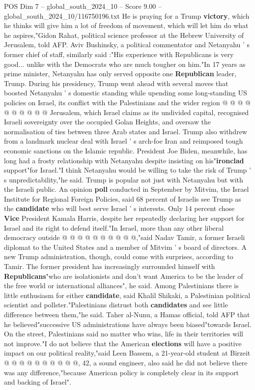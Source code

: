 \begin{textsample}{POS Dim 7 – global\_south\_2024\_10 – Score 9.00 – global\_south\_2024\_10/116750196.txt}
He is praying for a Trump \textbf{victory}, which he thinks will give him a lot of freedom of movement, which will let him do what he aspires,"Gidon Rahat, political science professor at the Hebrew University of Jerusalem, told AFP.
Aviv Bushinsky, a political commentator and Netanyahu ' s former chief of staff, similarly said :"His experience with Republicans is very good... unlike with the Democrats who are much tougher on him."In 17 years as prime minister, Netanyahu has only served opposite one \textbf{Republican} leader, Trump.
During his presidency, Trump went ahead with several moves that boosted Netanyahu ' s domestic standing while upending some long-standing US policies on Israel, its conflict with the Palestinians and the wider region @ @ @ @ @ @ @ @ @ @ Jerusalem, which Israel claims as its undivided capital, recognised Israeli sovereignty over the occupied Golan Heights, and oversaw the normalisation of ties between three Arab states and Israel.
Trump also withdrew from a landmark nuclear deal with Israel ' s arch-foe Iran and reimposed tough economic sanctions on the Islamic republic.
President Joe Biden, meanwhile, has long had a frosty relationship with Netanyahu despite insisting on his"\textbf{ironclad} support"for Israel."I think Netanyahu would be willing to take the risk of Trump ' s unpredictability,"he said.
Trump is popular not just with Netanyahu but with the Israeli public.
An opinion \textbf{poll} conducted in September by Mitvim, the Israel Institute for Regional Foreign Policies, said 68 percent of Israelis see Trump as the \textbf{candidate} who will best serve Israel ' s interests.
Only 14 percent chose \textbf{Vice} President Kamala Harris, despite her repeatedly declaring her support for Israel and its right to defend itself."In Israel, more than any other liberal democracy outside @ @ @ @ @ @ @ @ @ @,"said Nadav Tamir, a former Israeli diplomat to the United States and a member of Mitvim ' s board of directors.
A new Trump administration, though, could come with surprises, according to Tamir.
The former president has increasingly surrounded himself with \textbf{Republicans}"who are isolationists and don't want America to be the leader of the free world or international alliances", he said.
Among Palestinians there is little enthusiasm for either \textbf{candidate}, said Khalil Shikaki, a Palestinian political scientist and pollster."Palestinians distrust both \textbf{candidates} and see little difference between them,"he said.
Taher al-Nunu, a Hamas official, told AFP that he believed"successive US administrations have always been biased"towards Israel.
On the street, Palestinians said no matter who wins, life in their territories will not improve."I do not believe that the American \textbf{elections} will have a positive impact on our political reality,"said Leen Bassem, a 21-year-old student at Birzeit @ @ @ @ @ @ @ @ @ @, 42, a sound engineer, also said he did not believe there was any difference,"because American policy is completely clear in its support and backing of Israel".

\end{textsample}
